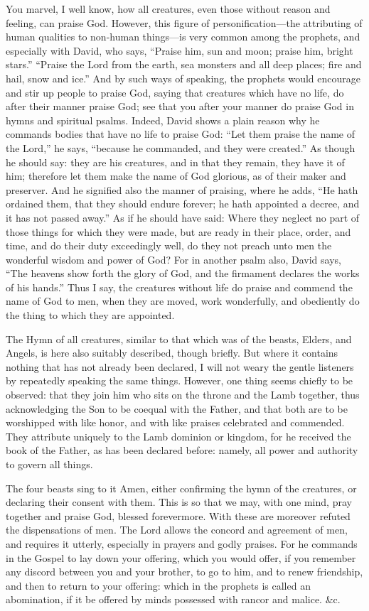 You marvel, I well know, how all creatures, even those without reason and feeling, can praise God. However, this figure of personification—the attributing of human qualities to non-human things—is very common among the prophets, and especially with David, who says, “Praise him, sun and moon; praise him, bright stars.” “Praise the Lord from the earth, sea monsters and all deep places; fire and hail, snow and ice.” And by such ways of speaking, the prophets would encourage and stir up people to praise God, saying that creatures which have no life, do after their manner praise God; see that you after your manner do praise God in hymns and spiritual psalms. Indeed, David shows a plain reason why he commands bodies that have no life to praise God: “Let them praise the name of the Lord,” he says, “because he commanded, and they were created.” As though he should say: they are his creatures, and in that they remain, they have it of him; therefore let them make the name of God glorious, as of their maker and preserver. And he signified also the manner of praising, where he adds, “He hath ordained them, that they should endure forever; he hath appointed a decree, and it has not passed away.” As if he should have said: Where they neglect no part of those things for which they were made, but are ready in their place, order, and time, and do their duty exceedingly well, do they not preach unto men the wonderful wisdom and power of God? For in another psalm also, David says, “The heavens show forth the glory of God, and the firmament declares the works of his hands.” Thus I say, the creatures without life do praise and commend the name of God to men, when they are moved, work wonderfully, and obediently do the thing to which they are appointed.

The Hymn of all creatures, similar to that which was of the beasts, Elders, and Angels, is here also suitably described, though briefly. But where it contains nothing that has not already been declared, I will not weary the gentle listeners by repeatedly speaking the same things. However, one thing seems chiefly to be observed: that they join him who sits on the throne and the Lamb together, thus acknowledging the Son to be coequal with the Father, and that both are to be worshipped with like honor, and with like praises celebrated and commended. They attribute uniquely to the Lamb dominion or kingdom, for he received the book of the Father, as has been declared before: namely, all power and authority to govern all things.

The four beasts sing to it Amen, either confirming the hymn of the creatures, or declaring their consent with them. This is so that we may, with one mind, pray together and praise God, blessed forevermore. With these are moreover refuted the dispensations of men. The Lord allows the concord and agreement of men, and requires it utterly, especially in prayers and godly praises. For he commands in the Gospel to lay down your offering, which you would offer, if you remember any discord between you and your brother, to go to him, and to renew friendship, and then to return to your offering: which in the prophets is called an abomination, if it be offered by minds possessed with rancor and malice. \&c.

